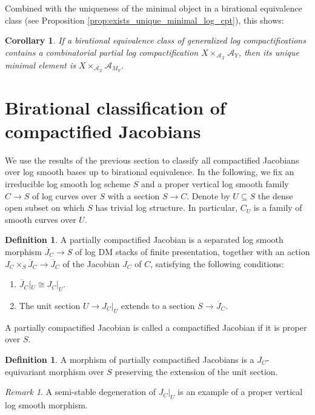 \documentclass[11pt]{amsart}
\newtheorem{corollary}[theorem]{Corollary}
\theoremstyle{definition}
\newtheorem{definition}[theorem]{Definition}
\theoremstyle{remark}
\newtheorem{remark}[theorem]{Remark}
\begin{document}
Combined with the uniqueness of the minimal object in a birational equivalence class (see Proposition \ref{prop:exists_unique_minimal_log_cpt}), this shows:

\begin{corollary}
	\label{cor:unique_minimal_combinat}
	If a birational equivalence class of generalized log compactifications contains a combinatorial partial log compactification
	$X\times_{\mathcal{A}_{\mathcal{X}}}\mathcal{A}_{Y}$, then its unique minimal element
	is $X\times_{\mathcal{A}_{\mathcal{X}}}\mathcal{A}_{M_{Y}}$.
\end{corollary}

\section{Birational classification of compactified Jacobians}
\label{sec:bir_class_jac}

We use the results of the previous section to classify all compactified Jacobians over log smooth bases
up to birational equivalence. In the following, we fix an irreducible log smooth log scheme $S$
and a proper vertical log smooth family $C\to S$ of log curves over $S$ with a section $S\to C$. Denote by $U\subseteq S$ the dense open subset
on which $S$ has trivial log structure. In particular, $C_U$ is a family of smooth curves over $U$.

\begin{definition}
	A partially compactified Jacobian is a separated log smooth morphism $\overline{J}_C\to S$ of
	log DM stacks of finite presentation, together with an action $J_C\times_S \overline{J}_C\to \overline{J}_C$
	of the Jacobian $J_C$ of $C$, satisfying the following conditions:
	\begin{enumerate}
		\item $\overline{J}_C|_U\cong J_C|_U$.
		\item The unit section $U\to J_C|_U$ extends to a section $S\to \overline{J}_C$.
	\end{enumerate}
	A partially compactified Jacobian is called a compactified Jacobian if it is proper over $S$.
\end{definition}

\begin{definition}
	A morphism of partially compactified Jacobians is a
	$J_C$-equivariant morphism over $S$ preserving the extension of the unit section.
\end{definition}

\begin{remark}
	A semi-stable degeneration of $J_C|_U$ is an example of a proper
	vertical log smooth morphism.
\end{remark}
\end{document}

